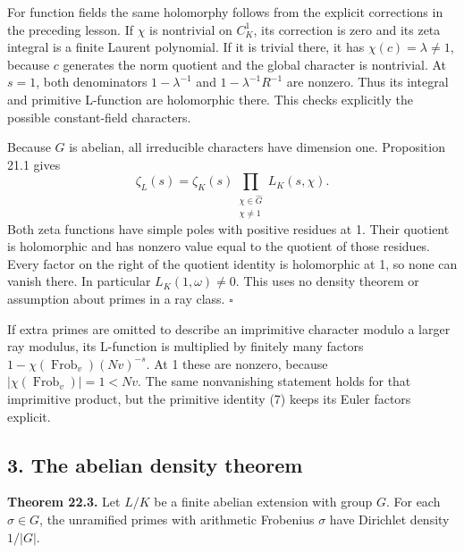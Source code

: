 \documentclass[11pt,a4paper]{article}
\begin{document}
For function fields the same holomorphy follows from the explicit
corrections in the preceding lesson. If \(\chi\) is nontrivial on
\(C_K^1\), its correction is zero and its zeta integral is a finite
Laurent polynomial. If it is trivial there, it has
\(\chi(c)=\lambda\ne1\), because \(c\) generates the norm quotient and
the global character is nontrivial. At \(s=1\), both denominators
\(1-\lambda^{-1}\) and \(1-\lambda^{-1}R^{-1}\) are nonzero. Thus its
integral and primitive L-function are holomorphic there. This checks
explicitly the possible constant-field characters.

Because \(G\) is abelian, all irreducible characters have dimension one.
Proposition 21.1 gives \[
\zeta_L(s)=\zeta_K(s)\prod_{\substack{\chi\in\widehat G\\\chi\ne1}}L_K(s,\chi).
\tag{7}
\] Both zeta functions have simple poles with positive residues at 1.
Their quotient is holomorphic and has nonzero value equal to the
quotient of those residues. Every factor on the right of the quotient
identity is holomorphic at 1, so none can vanish there. In particular
\(L_K(1,\omega)\ne0\). This uses no density theorem or assumption about
primes in a ray class. \(\square\)

If extra primes are omitted to describe an imprimitive character modulo
a larger ray modulus, its L-function is multiplied by finitely many
factors \(1-\chi(\operatorname{Frob}_v)(Nv)^{-s}\). At 1 these are
nonzero, because \(|\chi(\operatorname{Frob}_v)|=1<Nv\). The same
nonvanishing statement holds for that imprimitive product, but the
primitive identity (7) keeps its Euler factors explicit.

\subsection{3. The abelian density
theorem}\label{the-abelian-density-theorem}

\textbf{Theorem 22.3.} Let \(L/K\) be a finite abelian extension with
group \(G\). For each \(\sigma\in G\), the unramified primes with
arithmetic Frobenius \(\sigma\) have Dirichlet density \(1/|G|\).
\end{document}
